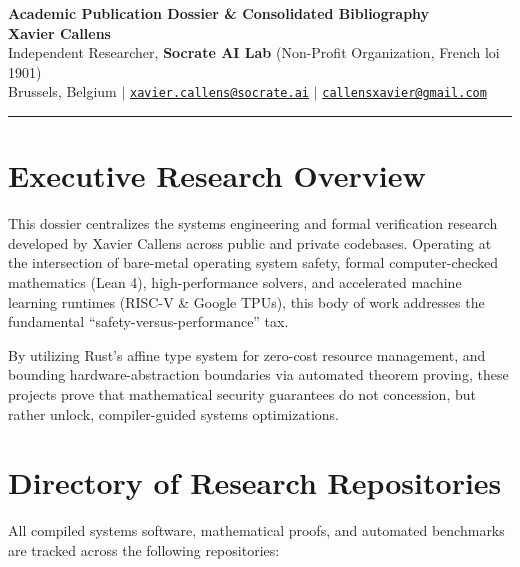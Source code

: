 \documentclass[11pt,a4paper]{article}
\begin{document}
\begin{center}
    {\LARGE \textbf{Academic Publication Dossier \& Consolidated Bibliography}} \\[0.4cm]
    {\large \textbf{Xavier Callens}} \\[0.2cm]
    Independent Researcher, \textbf{Socrate AI Lab} (Non-Profit Organization, French loi 1901) \\
    Brussels, Belgium $|$ \href{mailto:xavier.callens@socrate.ai}{\texttt{xavier.callens@socrate.ai}} $|$ \href{mailto:callensxavier@gmail.com}{\texttt{callensxavier@gmail.com}}
\end{center}

\vspace{0.4cm}
\hrule
\vspace{0.4cm}

\section{Executive Research Overview}
This dossier centralizes the systems engineering and formal verification research developed by Xavier Callens across public and private codebases. Operating at the intersection of bare-metal operating system safety, formal computer-checked mathematics (Lean 4), high-performance solvers, and accelerated machine learning runtimes (RISC-V \& Google TPUs), this body of work addresses the fundamental ``safety-versus-performance'' tax. 

By utilizing Rust's affine type system for zero-cost resource management, and bounding hardware-abstraction boundaries via automated theorem proving, these projects prove that mathematical security guarantees do not concession, but rather unlock, compiler-guided systems optimizations.

\section{Directory of Research Repositories}
All compiled systems software, mathematical proofs, and automated benchmarks are tracked across the following repositories:
\end{document}
